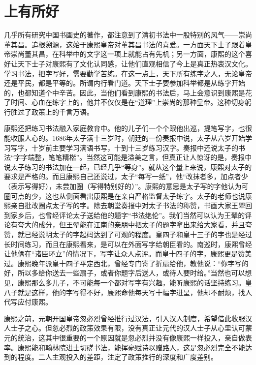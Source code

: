 \section{上有所好}


几乎所有研究中国书画史的著作，都注意到了清初书法中一股特别的风气——崇尚董其昌。追根溯源，这始于康熙皇帝对董其昌书法的喜爱。一方面天下士子跟着皇帝崇尚董其昌，在科举中的文字这一项上就能占有先机；另一方面，康熙的这个喜好让天下士子对康熙有了文化认同感，让他们直观相信了今上是真正热衷汉文化。学习书法，把字写好，需要勤学苦练。在这一点上，天下所有练字之人，无论皇帝还是平民，都是平等的。所谓内行看门道。天下士子要参加科举都是从练字开始的，也都知道个中辛苦。因此，当他们看到康熙的书法后，马上会意识到康熙是花了时间、心血在练字上的，他并不仅仅是在“道理”上崇尚的那种皇帝。这种切身躬行胜过了政策上的千言万语。



康熙还把练习书法融入家庭教育中。他的儿子们一个个跟他出巡，提笔写字，也很能收服人心的。1686年太子满十三岁时，朝廷的一份奏报中说，太子从六岁开始学习写字，十岁前主要学习满语书写，十到十三岁练习汉字。奏报中还说太子的书法“字字端整，笔笔精楷”。当然这可能是溢美之言，但真正让人惊讶的是，奏报中说太子练习的书法加在一起，已经几乎“等身”。就从这个量上来说，康熙对太子的要求是严格的。而且康熙自己还说过，太子“每写一纸”，他“改抹者多，加点者少（表示写得好），未尝加圈（写得特别好的）”。康熙的意思是太子写的字他认为可圈可点的少，这也从侧面看出康熙是在亲自严格监督太子练字。太子的老师也说康熙亲自批改圈点太子写的字。除去朝堂奏报中对太子书法的称赞，书画大家王翚回到家乡后，也曾经评论太子送给他的题字“书法绝伦”。我们当然可以认为王翚的评论有夸大的成分，但王翚能在江南的亲朋中把太子的题字拿出来给大家看，并且夸赞，就已经说明太子的字起码达到了可观的程度。皇四子和皇十三子的字也是经过长时间练习，而且在康熙看来，是可以在外面写字给朝臣看的。南巡时，康熙曾经让他俩在“诸臣环立”的情况下，写字让众人点评。而皇十四子的字，康熙更是赞美过。康熙晚年派皇十四子平定西北，曾经专门寄了折扇给他，教他说：“你字写的好，所以多给你送去一些扇子，或者你题字后送人，或待人要时给。”当然也可以想见，康熙那么多儿子，不可能每一个都对写字有兴趣，能听康熙的话坚持练习。皇八子就是这样，他的字写得不好，康熙命他每天写十幅字进呈，他却不耐烦，找人代写应付康熙。



康熙之前，元朝开国皇帝忽必烈曾经推行过汉法，引入汉人制度，希望借此收服汉人士子之心。但忽必烈的政策效果有限，没有真正让元代的汉人士子从心里认可蒙元的统治，这其中很重要的一个原因就是忽必烈并没有像康熙一样投入，亲自做表率。康熙能和翰林院进士切磋书法，能挥毫赋诗以赠路人，这是忽必烈完全不能达到的程度。二人主观投入的差距，注定了政策推行的深度和广度差别。


